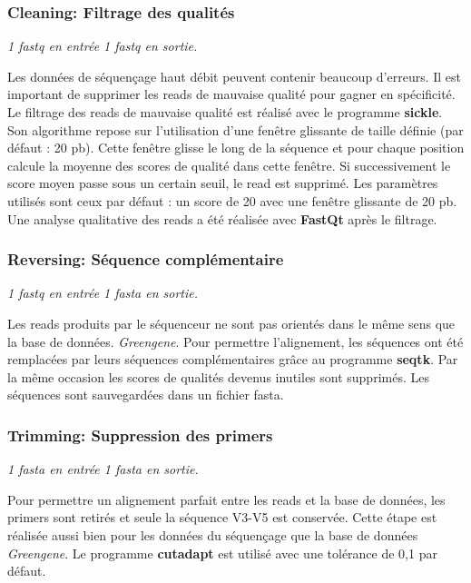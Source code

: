 \documentclass[12pt,a4paper]{article}
\begin{document}
\subsubsection{Cleaning: Filtrage des qualités}
\noindent\emph{1 fastq en entrée 1 fastq en sortie. }

Les données de séquençage haut débit peuvent contenir beaucoup d'erreurs. Il est important de supprimer les reads de mauvaise qualité pour gagner en spécificité.
Le filtrage des reads de mauvaise qualité est réalisé avec le programme \textbf{sickle}\cite{JoshiNA2011}. Son algorithme repose sur l'utilisation d'une fenêtre glissante de taille définie (par défaut : 20 pb). Cette fenêtre glisse le long de la séquence et pour chaque position calcule la moyenne des scores de qualité dans cette fenêtre. Si successivement le score moyen passe sous un certain seuil, le read est supprimé. Les paramètres utilisés sont ceux par défaut : un score de 20 avec une fenêtre glissante de 20 pb.
Une analyse qualitative des reads a été réalisée avec \textbf{FastQt}\cite{Labsquareteam2017} après le filtrage.


\subsubsection{Reversing: Séquence complémentaire}
\noindent\emph{1 fastq en entrée 1 fasta en sortie. }

Les reads produits par le séquenceur ne sont pas orientés dans le même sens que la base de données. \textit{Greengene}\cite{DeSantis2006}. Pour permettre l'alignement, les séquences ont été remplacées par leurs séquences complémentaires grâce au programme \textbf{seqtk}\cite{H.Li}.
Par la même occasion les scores de qualités devenus inutiles sont supprimés. Les séquences sont sauvegardées dans un fichier fasta.

\subsubsection{Trimming: Suppression des primers}
\noindent\emph{1 fasta en entrée 1 fasta en sortie.}

Pour permettre un alignement parfait entre les reads et la base de données, les primers sont retirés et seule la séquence V3-V5 est conservée. Cette étape est réalisée aussi bien pour les données du séquençage que la base de données \textit{Greengene}.
Le programme \textbf{cutadapt}\cite{Martin2011} est utilisé avec une tolérance de 0,1 par défaut.
\end{document}

